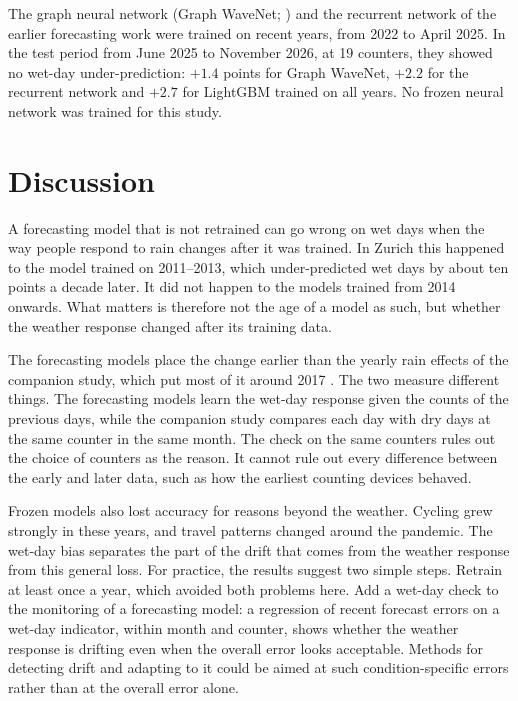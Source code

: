 \documentclass[preprint,12pt,authoryear]{elsarticle}
\begin{document}
The graph neural network (Graph WaveNet; \citealp{wu2019graph}) and the recurrent network of the earlier forecasting work were trained on recent years, from 2022 to April 2025. In the test period from June 2025 to November 2026, at 19 counters, they showed no wet-day under-prediction: $+1.4$ points for Graph WaveNet, $+2.2$ for the recurrent network and $+2.7$ for LightGBM trained on all years. No frozen neural network was trained for this study.

\section{Discussion}

A forecasting model that is not retrained can go wrong on wet days when the way people respond to rain changes after it was trained. In Zurich this happened to the model trained on 2011--2013, which under-predicted wet days by about ten points a decade later. It did not happen to the models trained from 2014 onwards. What matters is therefore not the age of a model as such, but whether the weather response changed after its training data.

The forecasting models place the change earlier than the yearly rain effects of the companion study, which put most of it around 2017 \citep{arzimanli2026rain}. The two measure different things. The forecasting models learn the wet-day response given the counts of the previous days, while the companion study compares each day with dry days at the same counter in the same month. The check on the same counters rules out the choice of counters as the reason. It cannot rule out every difference between the early and later data, such as how the earliest counting devices behaved.

Frozen models also lost accuracy for reasons beyond the weather. Cycling grew strongly in these years, and travel patterns changed around the pandemic. The wet-day bias separates the part of the drift that comes from the weather response from this general loss. For practice, the results suggest two simple steps. Retrain at least once a year, which avoided both problems here. Add a wet-day check to the monitoring of a forecasting model: a regression of recent forecast errors on a wet-day indicator, within month and counter, shows whether the weather response is drifting even when the overall error looks acceptable. Methods for detecting drift and adapting to it \citep{alippi2013just,ditzler2015learning,gama2014survey} could be aimed at such condition-specific errors rather than at the overall error alone.
\end{document}
